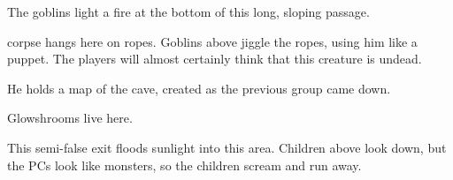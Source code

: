 \begin{multicols}{2}

The goblins light a fire at the bottom of this long, sloping passage.


 corpse hangs here on ropes.
Goblins above jiggle the ropes, using him like a puppet.
The players will almost certainly think that this creature is undead.

He holds a map of the cave, created as the previous group came down.


Glowshrooms live here.



This semi-false exit floods sunlight into this area.
Children above look down, but the PCs look like monsters, so the children scream and run away.




\end{multicols}
